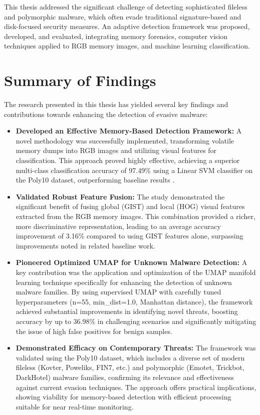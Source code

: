 This thesis addressed the significant challenge of detecting sophisticated fileless and polymorphic malware, which often evade traditional signature-based and disk-focused security measures. An adaptive detection framework was proposed, developed, and evaluated, integrating memory forensics, computer vision techniques applied to RGB memory images, and machine learning classification.

\section{Summary of Findings}
\label{sec:summary_findings}

The research presented in this thesis has yielded several key findings and contributions towards enhancing the detection of evasive malware:

\begin{itemize}
    \item \textbf{Developed an Effective Memory-Based Detection Framework:} A novel methodology was successfully implemented, transforming volatile memory dumps into RGB images and utilizing visual features for classification. This approach proved highly effective, achieving a superior multi-class classification accuracy of 97.49\% using a Linear SVM classifier on the Poly10 dataset, outperforming baseline results \citep{bozkir2021catch}.

    \item \textbf{Validated Robust Feature Fusion:} The study demonstrated the significant benefit of fusing global (GIST) and local (HOG) visual features extracted from the RGB memory images. This combination provided a richer, more discriminative representation, leading to an average accuracy improvement of 3.16\% compared to using GIST features alone, surpassing improvements noted in related baseline work.

    \item \textbf{Pioneered Optimized UMAP for Unknown Malware Detection:} A key contribution was the application and optimization of the UMAP manifold learning technique specifically for enhancing the detection of unknown malware families. By using supervised UMAP with carefully tuned hyperparameters (n=55, min\_dist=1.0, Manhattan distance), the framework achieved substantial improvements in identifying novel threats, boosting accuracy by up to 36.98\% in challenging scenarios and significantly mitigating the issue of high false positives for benign samples.

    \item \textbf{Demonstrated Efficacy on Contemporary Threats:} The framework was validated using the Poly10 dataset, which includes a diverse set of modern fileless (Kovter, Poweliks, FIN7, etc.) and polymorphic (Emotet, Trickbot, DarkHotel) malware families, confirming its relevance and effectiveness against current evasion techniques. The approach offers practical implications, showing viability for memory-based detection with efficient processing suitable for near real-time monitoring.
\end{itemize}


